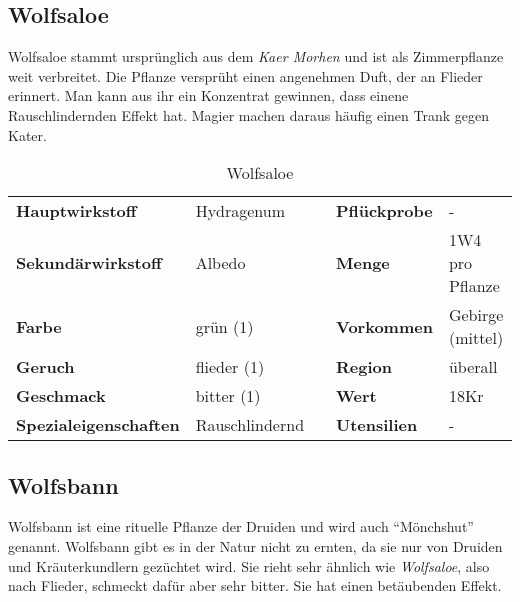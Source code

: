 \subsection{Wolfsaloe}
Wolfsaloe stammt ursprünglich aus dem \textit{Kaer Morhen} und ist als Zimmerpflanze weit verbreitet. Die Pflanze versprüht einen angenehmen Duft, der an Flieder erinnert. Man kann aus ihr ein Konzentrat gewinnen, dass einene Rauschlindernden Effekt hat. Magier machen daraus häufig einen Trank gegen Kater.

\begin{table}[H] 
\begin{center} 
\begin{tabular}{|l|l|p{1cm}|l|l|} 
  	\cline{1-2} \cline{4-5} 
  	\textbf{Hauptwirkstoff} & Hydragenum && \textbf{Pflückprobe} & - \\ \cline{1-2} \cline{4-5} 
  	\textbf{Sekundärwirkstoff} & Albedo && \textbf{Menge} & 1W4 pro Pflanze \\ \cline{1-2} \cline{4-5} 
  	\textbf{Farbe} & grün (1) && \textbf{Vorkommen} & Gebirge (mittel) \\ \cline{1-2} \cline{4-5} 
  	\textbf{Geruch} & flieder (1) && \textbf{Region} & überall \\ \cline{1-2} \cline{4-5} 
  	\textbf{Geschmack} & bitter (1) && \textbf{Wert} & 18Kr \\ \cline{1-2} \cline{4-5} 
  	\textbf{Spezialeigenschaften} & Rauschlindernd && \textbf{Utensilien} & - \\ \cline{1-2} \cline{4-5} 
\end{tabular} 
\end{center} 
\caption{Wolfsaloe} 
\label{tab:wolfsaloe} 
\end{table}

\subsection{Wolfsbann}
Wolfsbann ist eine rituelle Pflanze der Druiden und wird auch "`Mönchshut"' genannt. Wolfsbann gibt es in der Natur nicht zu ernten, da sie nur von Druiden und Kräuterkundlern gezüchtet wird. Sie rieht sehr ähnlich wie \textit{Wolfsaloe}, also nach Flieder, schmeckt dafür aber sehr bitter. Sie hat einen betäubenden Effekt.

